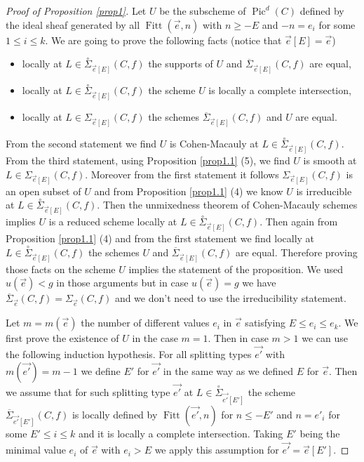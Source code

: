 \documentclass{article}
\DeclareMathOperator{\Pic}{Pic}
\DeclareMathOperator{\Fitt}{Fitt}
\theoremstyle{definition}
\theoremstyle{remark}
\begin{document}
\begin{proof}[Proof of Proposition \ref{prop1}]
Let $U$ be  the subscheme of  $\Pic^d(C)$ defined by the ideal sheaf generated by all $\Fitt (\overrightarrow {e},n)$ with $n \geq -E$ and $-n = e_i$ for some $1 \leq i \leq k$.
We are going to prove the following facts (notice that $\overrightarrow {e}[E]=\overrightarrow {e}$)
\begin{itemize}
\item locally at $L \in \overset {\circ}{\Sigma}_{\overrightarrow {e}[E]}(C,f)$ the supports of $U$ and $\overline {\Sigma }_{\overrightarrow {e}[E]}(C,f)$ are equal,
\item locally at $L \in \overset {\circ}{\Sigma}_{\overrightarrow {e}[E]}(C,f)$ the scheme $U$ is locally a complete intersection,
\item locally at $L \in \Sigma_{\overrightarrow {e}[E]}(C,f)$ the schemes $\overline {\Sigma }_{\overrightarrow {e}[E]}(C,f)$ and $U$ are equal.
\end{itemize}

From the second statement we find $U$ is Cohen-Macauly at $L \in \overset {\circ}{\Sigma}_{\overrightarrow {e}[E]}(C,f)$.
From the third statement, using Proposition \ref{prop1.1} (5), we find $U$ is smooth at $L \in \Sigma_{\overrightarrow {e}[E]}(C,f)$.
Moreover from the first statement it follows $\Sigma_{\overrightarrow {e}[E]}(C,f)$ is an open subset of $U$ and from Proposition \ref{prop1.1} (4) we know $U$ is irreducible at $L \in \overset {\circ}{\Sigma}_{\overrightarrow {e}[E]}(C,f)$.
Then the unmixedness theorem of Cohen-Macauly schemes implies $U$ is a reduced scheme locally at $L \in \overset {\circ}{\Sigma}_{\overrightarrow {e}[E]}(C,f)$.
Then again from Proposition \ref{prop1.1} (4) and from the first statement we find locally at $L \in \overset {\circ}{\Sigma}_{\overrightarrow {e}[E]}(C,f)$ the schemes $U$ and $\overline {\Sigma }_{\overrightarrow {e}[E]}(C,f)$ are equal.
Therefore proving those facts on the scheme $U$ implies the statement of the proposition.
We used $u(\overrightarrow {e}) <g$ in those arguments but in case $u(\overrightarrow {e})=g$ we have $\overline{\Sigma}_{\overrightarrow {e}}(C,f)=\Sigma_{\overrightarrow {e}}(C,f)$ and we don't need to use the irreducibility statement.

Let $m=m(\overrightarrow {e})$ the number of  different values $e_i$ in $\overrightarrow {e}$ satisfying $E \leq e_i \leq e_k$.
We first prove the existence of $U$ in the case $m=1$.
Then in case $m>1$ we can use the following induction hypothesis.
For all splitting types $\overrightarrow {e'}$ with $m(\overrightarrow {e'})=m-1$ we define $E'$ for $\overrightarrow {e'}$ in the same way as we defined $E$ for $\overrightarrow {e}$.
Then we assume that for such splitting type $\overrightarrow {e'}$ at $L \in \overset {\circ}{\Sigma}_{\overrightarrow {e'}[E']}$ the scheme $\overline {\Sigma}_{\overrightarrow {e'}[E']}(C,f)$ is locally defined by $\Fitt (\overrightarrow {e'},n)$ for $n \leq -E'$ and $n =e'_i$ for some $E' \leq i \leq k$  and it is locally a complete intersection.
Taking $E'$ being the minimal value $e_i$ of $\overrightarrow {e}$ with $e_i>E$ we apply this assumption for $\overrightarrow {e'}=\overrightarrow {e}[E']$.


\end{proof}
\end{document}
